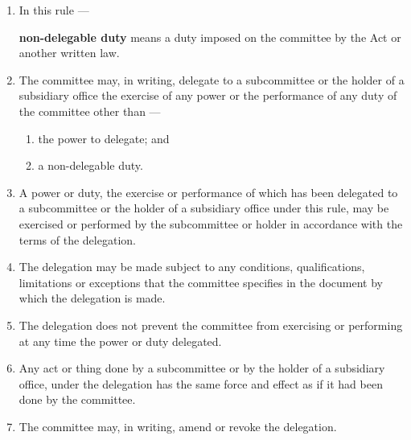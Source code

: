 \documentclass[../constitution.tex]{subfiles}
\begin{document}
\begin{enumerate}

\item In this rule ---

\textbf{non-delegable duty} means a duty imposed on the committee by the Act or another written law.

\item The committee may, in writing, delegate to a subcommittee or the holder of a subsidiary office the exercise of any power or the performance of any duty of the committee other than ---

  \begin{enumerate}
  
  \item the power to delegate; and
  \item a non-delegable duty.
  \end{enumerate}
\item A power or duty, the exercise or performance of which has been delegated to a subcommittee or the holder of a subsidiary office under this rule, may be exercised or performed by the subcommittee or holder in accordance with the terms of the delegation.
\item The delegation may be made subject to any conditions, qualifications, limitations or exceptions that the committee specifies in the document by which the delegation is made.
\item The delegation does not prevent the committee from exercising or performing at any time the power or duty delegated.
\item Any act or thing done by a subcommittee or by the holder of a subsidiary office, under the delegation has the same force and effect as if it had been done by the committee.
\item The committee may, in writing, amend or revoke the delegation.
\end{enumerate}
\end{document}
